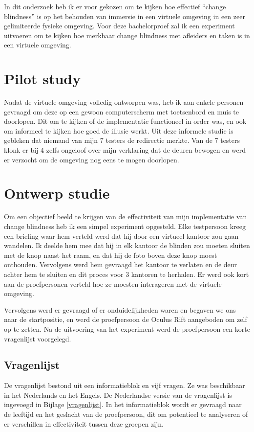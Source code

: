 In dit onderzoek heb ik er voor gekozen om te kijken hoe effectief ``change
blindness'' is op het behouden van immersie in een virtuele omgeving in een
zeer gelimiteerde fysieke omgeving. Voor deze bachelorproef zal ik een 
experiment uitvoeren om te kijken hoe merkbaar change blindness met afleiders en 
taken is in een virtuele omgeving.


\section{Pilot study}
Nadat de virtuele omgeving volledig ontworpen was, heb ik aan enkele personen
gevraagd om deze op een gewoon computerscherm met toetsenbord en muis te
doorlopen. Dit om te kijken of de implementatie functioneel in order was, en
ook om informeel te kijken hoe goed de illusie werkt. Uit deze informele studie 
is gebleken dat niemand van mijn 7 testers de redirectie merkte. Van de 7 testers
klonk er bij 4 zelfs ongeloof over mijn verklaring dat de deuren bewogen en werd
er verzocht om de omgeving nog eens te mogen doorlopen.


\section{Ontwerp studie}
Om een objectief beeld te krijgen van de effectiviteit van mijn implementatie van
change blindness heb ik een simpel experiment opgesteld. Elke testpersoon kreeg
een briefing waar hem verteld werd dat hij door een virtueel kantoor zou gaan
wandelen. Ik deelde hem mee dat hij in elk kantoor de blinden zou moeten sluiten 
met de knop naast het raam, en dat hij de foto boven deze knop moest onthouden.
Vervolgens werd hem gevraagd het kantoor te verlaten en de deur achter hem te
sluiten en dit proces voor 3 kantoren te herhalen. Er werd ook kort aan de 
proefpersonen verteld hoe ze moesten interageren met de virtuele omgeving.

Vervolgens werd er gevraagd of er onduidelijkheden waren en begaven we ons naar 
de startpositie, en werd de proefpersoon de Oculus Rift aangeboden om zelf op te 
zetten. Na de uitvoering van het experiment werd de proefpersoon een korte 
vragenlijst voorgelegd.


\subsection{Vragenlijst}
De vragenlijst bestond uit een informatieblok en vijf vragen. Ze was beschikbaar
in het Nederlands en het Engels. De Nederlandse versie van de vragenlijst is
ingevoegd in Bijlage \ref{vragenlijst}. In het informatieblok wordt er gevraagd 
naar de leeftijd en het geslacht van de proefpersoon, dit om potentieel te 
analyseren of er verschillen in effectiviteit tussen deze groepen zijn.


